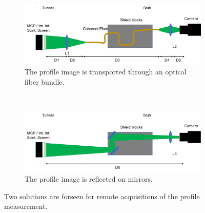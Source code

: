 \begin{figure}[!ht]
	\begin{subfigure}[t]{0.5\textwidth}
		\includegraphics[width=\textwidth]{05_Conclusion/figures/fig000_schematic_coherentr_fiber}
		\caption{The profile image is transported through an optical fiber bundle.}
		\label{chap5:fig:schematic:1}
	\end{subfigure}
	~
	\begin{subfigure}[t]{0.5\textwidth}
    \includegraphics[width=\textwidth]{05_Conclusion/figures/fig000_schematic_telescop_lens}
		\caption{The profile image is reflected on mirrors.}
		\label{chap5:fig:schematic:2}
	\end{subfigure}
	\caption[Two solutions are forseen for remote acquisitions of the profile measurement]{Two solutions are forseen for remote acquisitions of the profile measurement.}
	\label{chap5:fig:schematic}
\end{figure}
